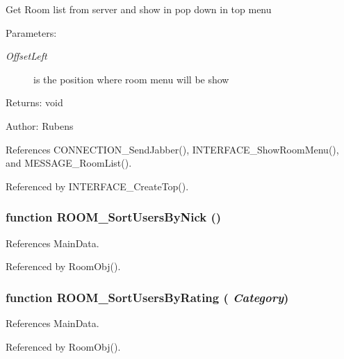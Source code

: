 Get Room list from server and show in pop down in top menu

\begin{Desc}
\item[Parameters:]
\begin{description}
\item[{\em OffsetLeft}]is the position where room menu will be show \end{description}
\end{Desc}
\begin{Desc}
\item[Returns:]void \end{Desc}
\begin{Desc}
\item[Author:]Rubens \end{Desc}


References CONNECTION\_\-SendJabber(), INTERFACE\_\-ShowRoomMenu(), and MESSAGE\_\-RoomList().

Referenced by INTERFACE\_\-CreateTop().
\subsubsection{\setlength{\rightskip}{0pt plus 5cm}function ROOM\_\-SortUsersByNick ()}\label{room_2room_8js_bf8006e7555a26d703c26d5251381d96}




References MainData.

Referenced by RoomObj().
\subsubsection{\setlength{\rightskip}{0pt plus 5cm}function ROOM\_\-SortUsersByRating ( {\em Category})}\label{room_2room_8js_99971ae4c58178caa43079c9214db58d}




References MainData.

Referenced by RoomObj().